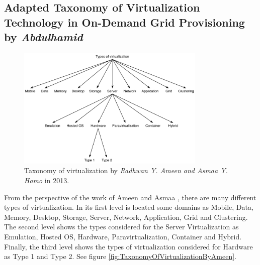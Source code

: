 	\subsection{Adapted Taxonomy of Virtualization Technology in On-Demand Grid Provisioning by \textit{Abdulhamid}}
	
	\begin{figure}[!hbtp]
		\centering
		\includegraphics[width=9cm]{images/AmeenAndHamo2003.pdf}
		\vspace{-0.2cm}
		\caption{Taxonomy of virtualization by \textit{Radhwan Y. Ameen and Asmaa Y. Hamo} in 2013\footnotemark[200]{}.}
		\label{fig:TaxonomyOfVirtualizationBugnion}
	\end{figure}
	

    From the perspective of the work of Ameen and Asmaa \cite{Ameen2013}, there are many different types of virtualization. In its first level is located some domains as  Mobile, Data, Memory, Desktop, Storage, Server, Network, Application, Grid and Clustering. The second level shows the types considered for the Server Virtualization as Emulation, Hosted OS, Hardware, Paravirtualization, Container and Hybrid. Finally, the third level shows the types of virtualization considered for Hardware as Type 1 and Type 2. See figure \ref{fig:TaxonomyOfVirtualizationByAmeen}.
  
